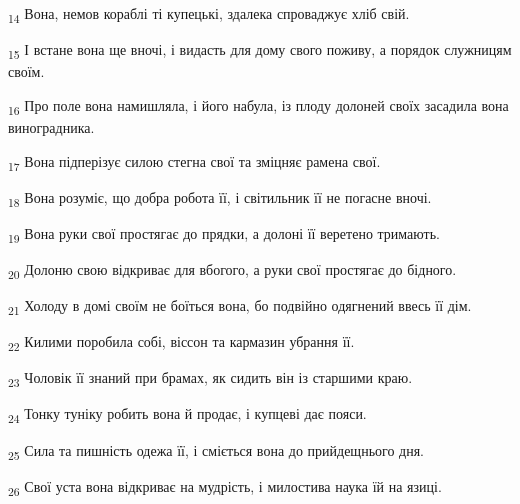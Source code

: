 \begin{tcolorbox}
\textsubscript{14} Вона, немов кораблі ті купецькі, здалека спроваджує хліб свій.
\end{tcolorbox}
\begin{tcolorbox}
\textsubscript{15} І встане вона ще вночі, і видасть для дому свого поживу, а порядок служницям своїм.
\end{tcolorbox}
\begin{tcolorbox}
\textsubscript{16} Про поле вона намишляла, і його набула, із плоду долоней своїх засадила вона виноградника.
\end{tcolorbox}
\begin{tcolorbox}
\textsubscript{17} Вона підперізує силою стегна свої та зміцняє рамена свої.
\end{tcolorbox}
\begin{tcolorbox}
\textsubscript{18} Вона розуміє, що добра робота її, і світильник її не погасне вночі.
\end{tcolorbox}
\begin{tcolorbox}
\textsubscript{19} Вона руки свої простягає до прядки, а долоні її веретено тримають.
\end{tcolorbox}
\begin{tcolorbox}
\textsubscript{20} Долоню свою відкриває для вбогого, а руки свої простягає до бідного.
\end{tcolorbox}
\begin{tcolorbox}
\textsubscript{21} Холоду в домі своїм не боїться вона, бо подвійно одягнений ввесь її дім.
\end{tcolorbox}
\begin{tcolorbox}
\textsubscript{22} Килими поробила собі, віссон та кармазин убрання її.
\end{tcolorbox}
\begin{tcolorbox}
\textsubscript{23} Чоловік її знаний при брамах, як сидить він із старшими краю.
\end{tcolorbox}
\begin{tcolorbox}
\textsubscript{24} Тонку туніку робить вона й продає, і купцеві дає пояси.
\end{tcolorbox}
\begin{tcolorbox}
\textsubscript{25} Сила та пишність одежа її, і сміється вона до прийдещнього дня.
\end{tcolorbox}
\begin{tcolorbox}
\textsubscript{26} Свої уста вона відкриває на мудрість, і милостива наука їй на язиці.
\end{tcolorbox}
